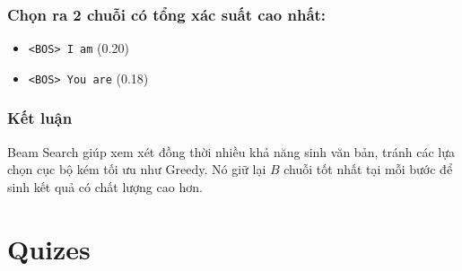 \documentclass{book}
\begin{document}
        \subsection*{Chọn ra 2 chuỗi có tổng xác suất cao nhất:}
        
        \begin{itemize}
            \item \texttt{<BOS> I am} \hfill (0.20)
            \item \texttt{<BOS> You are} \hfill (0.18)
        \end{itemize}
        
        \subsection*{Kết luận}
        
        Beam Search giúp xem xét đồng thời nhiều khả năng sinh văn bản, tránh các lựa chọn cục bộ kém tối ưu như Greedy.  
        Nó giữ lại $B$ chuỗi tốt nhất tại mỗi bước để sinh kết quả có chất lượng cao hơn.
\chapter{Quizes}
\end{document}
